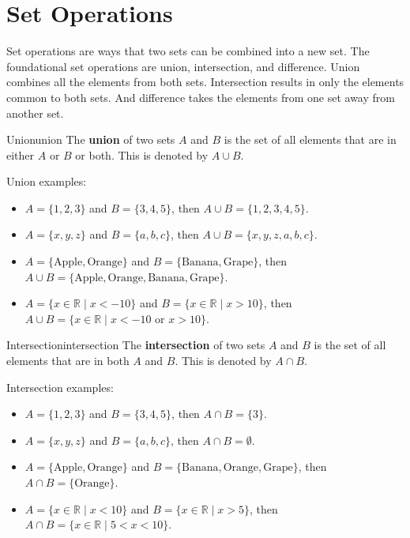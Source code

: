 \section{Set Operations}

Set operations are ways that two sets can be combined into a new set. The
foundational set operations are union, intersection, and difference. Union
combines all the elements from both sets. Intersection results in only the
elements common to both sets. And difference takes the elements from one
set away from another set.

\begin{definition}{Union}{union}
  The \textbf{union} of two sets \( A \) and \( B \) is the set of all elements
  that are in either \( A \) or \( B \) or both. This is denoted by \( A \cup B \).
\end{definition}

Union examples:
\begin{itemize}
  \item \( A = \{ 1, 2, 3 \} \) and \( B = \{ 3, 4, 5 \} \), then \( A \cup B = \{ 1, 2, 3, 4, 5 \} \).
  \item \( A = \{ x, y, z \} \) and \( B = \{ a, b, c \} \), then \( A \cup B = \{ x, y, z, a, b, c \} \).
  \item \( A = \{ \text{Apple}, \text{Orange} \} \) and \( B = \{ \text{Banana}, \text{Grape} \} \), then
  \( A \cup B = \{ \text{Apple}, \text{Orange}, \text{Banana}, \text{Grape} \} \).
  \item \( A = \{ x \in \mathbb{R} \mid x < -10 \} \) and \( B = \{ x \in \mathbb{R} \mid x > 10 \} \), then
  \( A \cup B = \{ x \in \mathbb{R} \mid x < -10 \text{ or } x > 10 \} \).
\end{itemize}

\begin{definition}{Intersection}{intersection}
  The \textbf{intersection} of two sets \( A \) and \( B \) is the set of all
  elements that are in both \( A \) and \( B \). This is denoted by \( A \cap B \).
\end{definition}

Intersection examples:
\begin{itemize}
  \item \( A = \{ 1, 2, 3 \} \) and \( B = \{ 3, 4, 5 \} \), then \( A \cap B = \{ 3 \} \).
  \item \( A = \{ x, y, z \} \) and \( B = \{ a, b, c \} \), then \( A \cap B = \emptyset \).
  \item \( A = \{ \text{Apple}, \text{Orange} \} \) and \( B = \{ \text{Banana}, \text{Orange}, \text{Grape} \} \), then
  \( A \cap B = \{ \text{Orange} \} \).
  \item \( A = \{ x \in \mathbb{R} \mid x < 10 \} \) and \( B = \{ x \in \mathbb{R} \mid x > 5 \} \), then
  \( A \cap B = \{ x \in \mathbb{R} \mid 5 < x < 10 \} \).
\end{itemize}

